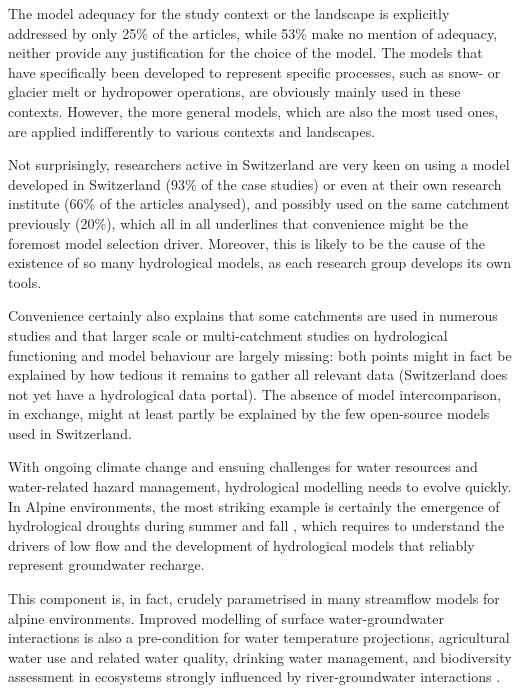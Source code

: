 \documentclass[10pt,a4paper]{article}
\begin{document}
The model adequacy for the study context or the landscape is explicitly
addressed by only 25\% of the articles, while 53\% make no mention of
adequacy, neither provide any justification for the choice of the model.
The models that have specifically been developed to represent specific
processes, such as snow- or glacier melt or hydropower operations, are
obviously mainly used in these contexts. However, the more general
models, which are also the most used ones, are applied indifferently to
various contexts and landscapes.

Not surprisingly, researchers active in Switzerland are very keen on
using a model developed in Switzerland (93\% of the case studies) or
even at their own research institute (66\% of the articles analysed),
and possibly used on the same catchment previously (20\%), which all in
all underlines that convenience might be the foremost model selection
driver. Moreover, this is likely to be the cause of the existence of so
many hydrological models, as each research group develops its own tools.

Convenience certainly also explains that some catchments are used in
numerous studies and that larger scale or multi-catchment studies on
hydrological functioning and model behaviour are largely missing: both
points might in fact be explained by how tedious it remains to gather
all relevant data (Switzerland does not yet have a hydrological data
portal). The absence of model intercomparison, in exchange, might at
least partly be explained by the few open-source models used in
Switzerland. 

With ongoing climate change and ensuing challenges for water resources
and water-related hazard management, hydrological modelling needs to
evolve quickly. In Alpine environments, the most striking example is
certainly the emergence of hydrological droughts \citep{Van_Loon_2015}
during summer and fall \citep{brunner2019drought,Rigling2020}, which requires to understand
the drivers of low flow \citep{Arnoux_2020} and the development of
hydrological models that reliably represent groundwater recharge.

This component is, in fact, crudely parametrised in many streamflow
models for alpine environments. Improved modelling of surface
water-groundwater interactions is also a pre-condition for water
temperature projections, agricultural water use and related water
quality, drinking water management, and biodiversity assessment in
ecosystems strongly influenced by river-groundwater
interactions \citep{Brunner_2017}. 
\end{document}
